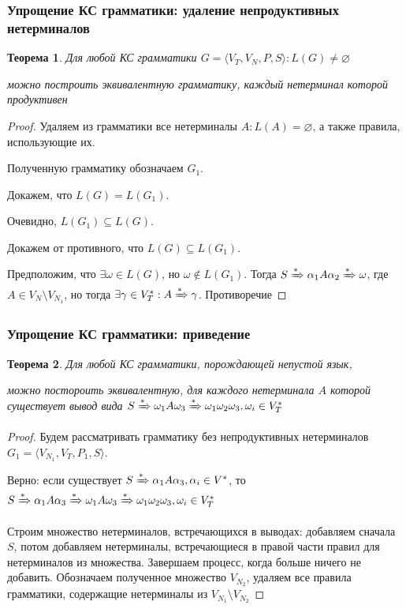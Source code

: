 \documentclass{beamer}
\newtheorem{rutheorem}{Теорема}
\newcommand{\derives}[1][*]{\xRightarrow[]{#1}}
\begin{document}
\begin{frame}[fragile]
  \transwipe[direction=90]
  \frametitle{Упрощение КС грамматики: удаление непродуктивных нетерминалов}

  \begin{rutheorem}
    Для любой КС грамматики $G = \langle V_T, V_N, P, S\rangle: L(G) \neq \varnothing$
    
    можно построить эквивалентную грамматику, каждый нетерминал которой продуктивен
  \end{rutheorem}

   \begin{proof}
   Удаляем из грамматики все нетерминалы $A: L(A) = \varnothing$, а также правила, использующие их. 
   
   Полученную грамматику обозначаем $G_1$.

   Докажем, что $L(G) = L(G_1)$. 
   
   Очевидно, $L(G_1) \subseteq L(G)$.

   Докажем от противного, что $L(G) \subseteq L(G_1)$. 
   
   Предположим, что $\exists \omega \in L(G)$, но $\omega \notin L(G_1)$. 
   Тогда $S \derives \alpha_1 A \alpha_2 \derives \omega$, где $A \in V_N \setminus V_{N_1}$, но тогда $\exists \gamma \in V_T^*: A \derives \gamma $. Противоречие
   \end{proof}
\end{frame}

\begin{frame}[fragile]
  \transwipe[direction=90]
  \frametitle{Упрощение КС грамматики: приведение}

  \begin{rutheorem}
    Для любой КС грамматики, порождающей непустой язык, 
    
    можно постороить эквивалентную, для каждого нетерминала $A$ которой существует вывод вида $S \derives \omega_1 A \omega_3 \derives \omega_1 \omega_2 \omega_3, \omega_i \in V_T^*$
  \end{rutheorem}

   \begin{proof}
   Будем рассматривать грамматику без непродуктивных нетерминалов $G_1 = \langle V_{N_1}, V_T, P_1, S\rangle$.
   
   Верно: если существует $S \derives \alpha_1 A \alpha_3, \alpha_i \in V^*$, то $S \derives \alpha_1 A \alpha_3 \derives \omega_1 A \omega_3 \derives \omega_1 \omega_2 \omega_3, \omega_i \in V_T^*$
   
   Строим множество нетерминалов, встречающихся в выводах: добавляем сначала $S$, потом добавляем нетерминалы, встречающиеся в правой части правил для нетерминалов из множества. Завершаем процесс, когда больше ничего не добавить. Обозначаем полученное множество $V_{N_2}$, удаляем все правила грамматики, содержащие нетерминалы из $ V_{N_1} \setminus V_{N_2}$
   
   
   \end{proof}
\end{frame}
\end{document}
